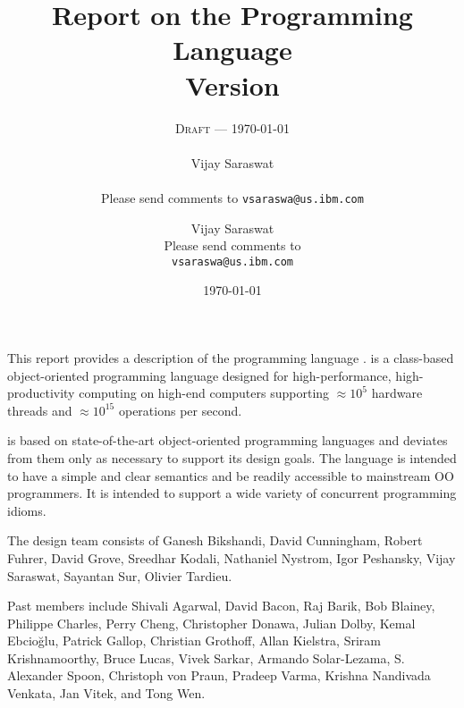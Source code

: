 
\thispagestyle{empty}


\title{Report on the Programming Language \Xten \\
\large Version \integerversion}
\ifdraft
\author{\textsc{Draft} --- \today \\
\\
Vijay Saraswat \\
\\
Please send comments to 
\texttt{vsaraswa@us.ibm.com}}
\else
\author{
Vijay Saraswat \\
Please send comments to \\
\texttt{vsaraswa@us.ibm.com}}
\fi
\date{\today}

\maketitle

\newcommand\authorsc[1]{#1}

This report provides a description of the programming
language \Xten. \Xten{} is a class-based object-oriented
programming language designed for high-performance, high-productivity
computing on high-end computers supporting $\approx 10^5$ hardware threads
and $\approx 10^{15}$ operations per second. 

\Xten{} is based on state-of-the-art object-oriented programming
languages and deviates from them only as necessary to support its
design goals. The language is intended to have a simple and clear
semantics and be readily accessible to mainstream OO programmers. It
is intended to support a wide variety of concurrent programming
idioms.


The \Xten{} design team consists of
\authorsc{Ganesh Bikshandi}, 
\authorsc{David Cunningham},
\authorsc{Robert Fuhrer},
\authorsc{David Grove},
\authorsc{Sreedhar Kodali}, 
\authorsc{Nathaniel Nystrom},
\authorsc{Igor Peshansky}, 
\authorsc{Vijay Saraswat},
\authorsc{Sayantan Sur}, 
\authorsc{Olivier Tardieu}.


Past members include
\authorsc{Shivali Agarwal}, 
\authorsc{David Bacon}, 
\authorsc{Raj Barik}, 
\authorsc{Bob Blainey}, 
\authorsc{Philippe Charles}, 
\authorsc{Perry Cheng}, 
\authorsc{Christopher Donawa}, 
\authorsc{Julian Dolby}, 
\authorsc{Kemal Ebcio\u{g}lu},
\authorsc{Patrick Gallop}, 
\authorsc{Christian Grothoff}, 
\authorsc{Allan Kielstra}, 
\authorsc{Sriram Krishnamoorthy}, 
\authorsc{Bruce Lucas},
\authorsc{Vivek Sarkar},
\authorsc{Armando Solar-Lezama},  
\authorsc{S. Alexander Spoon}, 
\authorsc{Christoph von Praun},
\authorsc{Pradeep Varma}, 
\authorsc{Krishna Nandivada Venkata},
\authorsc{Jan Vitek}, and
\authorsc{Tong Wen}.

